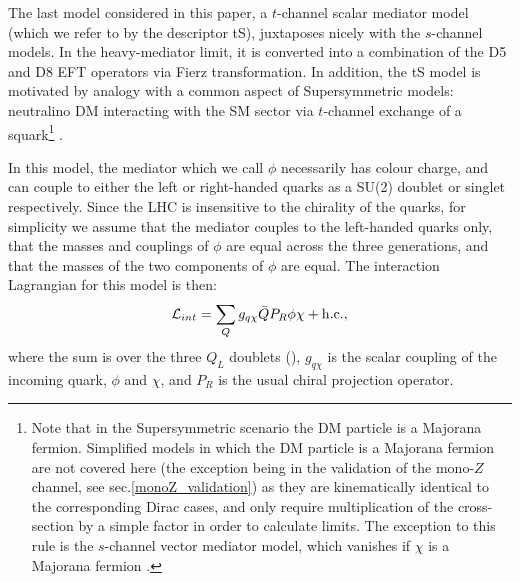 \begin{flushleft}

The last model considered in this paper, a $t$-channel scalar mediator model (which we refer to by the descriptor tS), juxtaposes nicely with the $s$-channel models. In the heavy-mediator limit, it is converted into a combination of the D5 and D8 EFT operators via Fierz transformation. In addition, the tS model is motivated by analogy with a common aspect of Supersymmetric models: neutralino DM interacting with the SM sector via $t$-channel exchange of a squark\footnote{Note that in the Supersymmetric scenario the DM particle is a Majorana fermion. Simplified models in which the DM particle is a Majorana fermion are not covered here (the exception being in the validation of the mono-$Z$ channel, see sec.\ref{monoZ_validation}) as they are kinematically identical to the corresponding Dirac cases, and only require multiplication of the cross-section by a simple factor in order to calculate limits. The exception to this rule is the $s$-channel vector mediator model, which vanishes if $\chi$ is a Majorana fermion \cite{METSig}.} \cite{SUSYDM}.
\bigskip

In this model, the mediator which we call $\phi$ necessarily has colour charge, and can couple to either the left or right-handed quarks as a SU(2) doublet or singlet respectively. Since the LHC is insensitive to the chirality of the quarks, for simplicity we assume that the mediator couples to the left-handed quarks only, that the masses and couplings of $\phi$ are equal across the three generations, and that the masses of the two components of $\phi$ are equal. The interaction Lagrangian for this model is then:
\begin{equation}
\label{L_int_tS}
\mathcal{L}_{int} = \sum_{Q} g_{q \chi} \bar{Q} P_R \phi \chi + {\rm h.c.},
\end{equation}
where the sum is over the three $Q_L$ doublets (), $g_{q \chi}$ is the scalar coupling of the incoming quark, $\phi$ and $\chi$, and $P_R$ is the usual chiral projection operator. 


\end{flushleft}
